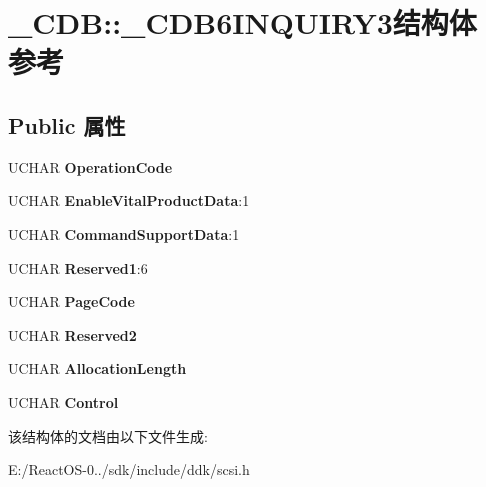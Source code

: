 \hypertarget{struct___c_d_b_1_1___c_d_b6_i_n_q_u_i_r_y3}{}\section{\+\_\+\+C\+DB\+:\+:\+\_\+\+C\+D\+B6\+I\+N\+Q\+U\+I\+R\+Y3结构体 参考}
\label{struct___c_d_b_1_1___c_d_b6_i_n_q_u_i_r_y3}
\subsection*{Public 属性}
\begin{DoxyCompactItemize}
\item 
\mbox{\label{struct___c_d_b_1_1___c_d_b6_i_n_q_u_i_r_y3_a1529c9ac79c5b6fcea0207f793cbbc2e}} 
U\+C\+H\+AR {\bfseries Operation\+Code}
\item 
\mbox{\label{struct___c_d_b_1_1___c_d_b6_i_n_q_u_i_r_y3_aacaec09106a247bb889c4df188864ecc}} 
U\+C\+H\+AR {\bfseries Enable\+Vital\+Product\+Data}\+:1
\item 
\mbox{\label{struct___c_d_b_1_1___c_d_b6_i_n_q_u_i_r_y3_a00b61a8390bc7613e88dc10deb4bed85}} 
U\+C\+H\+AR {\bfseries Command\+Support\+Data}\+:1
\item 
\mbox{\label{struct___c_d_b_1_1___c_d_b6_i_n_q_u_i_r_y3_a03286e5d073e90c02476005b91297518}} 
U\+C\+H\+AR {\bfseries Reserved1}\+:6
\item 
\mbox{\label{struct___c_d_b_1_1___c_d_b6_i_n_q_u_i_r_y3_aad19393c1ee9145aff03bb0442e3a6aa}} 
U\+C\+H\+AR {\bfseries Page\+Code}
\item 
\mbox{\label{struct___c_d_b_1_1___c_d_b6_i_n_q_u_i_r_y3_ae550435e68ff5d47b9d812862c291077}} 
U\+C\+H\+AR {\bfseries Reserved2}
\item 
\mbox{\label{struct___c_d_b_1_1___c_d_b6_i_n_q_u_i_r_y3_aabe7344dcdf60c046b1beb9074c15b1a}} 
U\+C\+H\+AR {\bfseries Allocation\+Length}
\item 
\mbox{\label{struct___c_d_b_1_1___c_d_b6_i_n_q_u_i_r_y3_a83115b41a5c62223ef3e5e4492f222e8}} 
U\+C\+H\+AR {\bfseries Control}
\end{DoxyCompactItemize}


该结构体的文档由以下文件生成\+:\begin{DoxyCompactItemize}
\item 
E\+:/\+React\+O\+S-\/0../sdk/include/ddk/scsi.\+h\end{DoxyCompactItemize}
